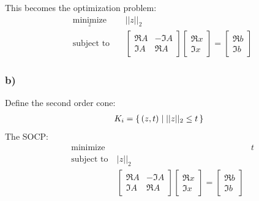 \documentclass[12pt]{article}
\begin{document}
This becomes the optimization problem:
\begin{equation*}
\begin{aligned}
& \underset{z}{\text{minimize}}
& & ||z||_2\\
& \text{subject to}\
& &
\begin{bmatrix}
\Re A & -\Im A\\
\Im A & \Re A
\end{bmatrix}
\begin{bmatrix}
\Re x \\
\Im x
\end{bmatrix}=
\begin{bmatrix}
\Re b\\
\Im b
\end{bmatrix}
\end{aligned}
\end{equation*}

\subsubsection*{b)}
Define the second order cone:
\begin{equation*}
\begin{aligned}
K_i = \set{(z,t)| ||z||_2 \le t}
\end{aligned}
\end{equation*}
The SOCP:
\begin{equation*}
\begin{aligned}
& \underset{}{\text{minimize}}
& & t\\
& \text{subject to}\
& |z||_2\\
& &
\begin{bmatrix}
\Re A & -\Im A\\
\Im A & \Re A
\end{bmatrix}
\begin{bmatrix}
\Re x \\
\Im x
\end{bmatrix}=
\begin{bmatrix}
\Re b\\
\Im b
\end{bmatrix}\end{aligned}
\end{equation*}
\end{document}
